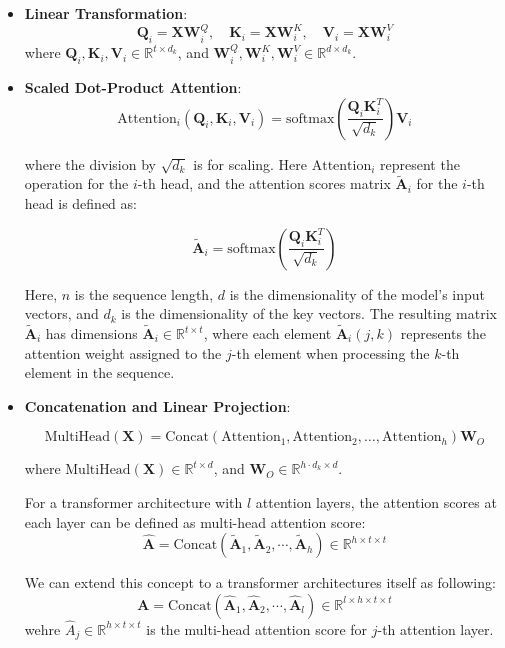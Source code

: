 \documentclass{article} %
\theoremstyle{bfnote}
\begin{document}
\begin{itemize}
	\item \textbf{Linear Transformation}:
	\[
	\bm{Q}_i = \bm{XW}^Q_{i}, \quad \bm{K}_i = \bm{XW}^K_{i}, \quad \bm{V}_i = \bm{XW}^V_{i}
	\]
	where \(\bm{Q}_i, \bm{K}_i, \bm{V}_i \in \mathbb{R}^{t \times d_k}\), and \(\bm{W}^Q_{i}, \bm{W}^K_{i}, \bm{W}^V_{i} \in \mathbb{R}^{d \times d_k}\).
	
	\item \textbf{Scaled Dot-Product Attention}:
	\[
	\text{Attention}_{i}(\bm{Q}_i, \bm{K}_i, \bm{V}_i) = \text{softmax}\left(\frac{\bm{Q}_i\bm{K}_i^T}{\sqrt{d_k}}\right) \bm{V}_i
	\]
	
	where the division by \(\sqrt{d_k}\) is for scaling. Here \( \text{Attention}_{i}\) represent the operation for the \(i\)-th head, and the attention scores matrix $\widetilde{\bm{A}}_i$ for the $i$-th head is defined as:
	
	\begin{equation}
		\widetilde{\bm{A}}_i = \text{softmax}\left(\frac{\bm{Q}_i\bm{K}_i^T}{\sqrt{d_k}}\right)
	\end{equation}

	
	Here, $n$ is the sequence length, $d$ is the dimensionality of the model's input vectors, and $d_k$ is the dimensionality of the key vectors. The resulting matrix $\widetilde{\bm{A}}_i$ has dimensions $\widetilde{\bm{A}}_i \in \mathbb{R}^{t \times t}$, where each element $\widetilde{\bm{A}}_i(j, k)$ represents the attention weight assigned to the $j$-th element when processing the $k$-th element in the sequence. 
	
	
	\item \textbf{Concatenation and Linear Projection}:
	
	\[
	\text{MultiHead}(\bm{X}) = \text{Concat}(\text{Attention}_1, \text{Attention}_2, \ldots, \text{Attention}_h)\bm{W}_O
	\]
	
	where \(\text{MultiHead}(\bm{X}) \in \mathbb{R}^{t \times d}\), and \(\bm{W}_O \in \mathbb{R}^{h \cdot d_k \times d}\).
	
	For a transformer architecture with $l$ attention layers, the attention scores at each layer can be defined as multi-head attention score:
	 \begin{equation}
	 \bm{\widehat{A}} = \text{Concat}(\widetilde{\bm{A}}_1, \widetilde{\bm{A}}_2, \cdots, \widetilde{\bm{A}}_h) \in \mathbb{R}^{h \times t \times t}
	 \end{equation}
	 
	 We can extend this concept to a transformer architectures itself as following:
	 \begin{equation}
	 		 \bm{A}=\text{Concat}(\bm{\widehat{A}}_1, \bm{\widehat{A}}_2, \cdots, \bm{\widehat{A}}_l) \in \mathbb{R}^{l \times h \times t \times t}
	 \end{equation}
	wehre $\widehat{A}_j \in \mathbb{R}^{h \times t \times t}$ is the multi-head attention score for $j$-th attention layer.
\end{itemize}
\end{document}

